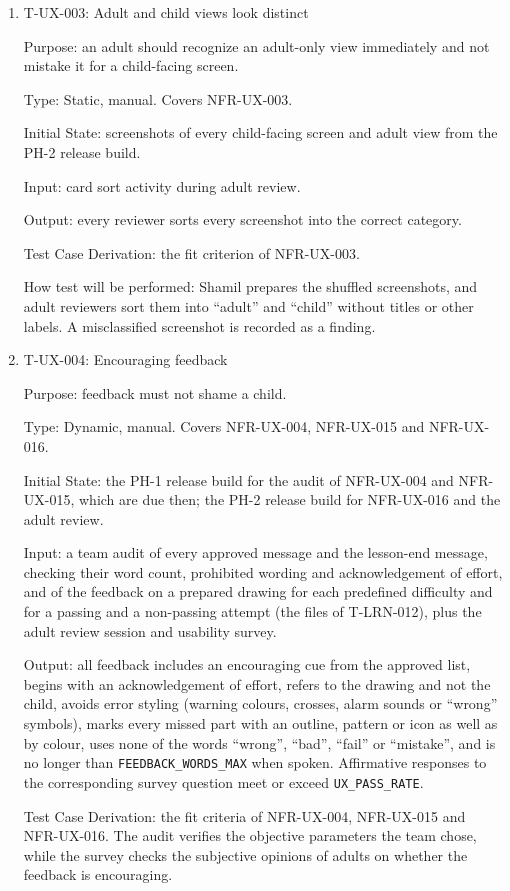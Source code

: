 \documentclass[12pt, titlepage]{article}
\newcommand{\testitem}[1]{\item #1\par\nopagebreak}
\begin{document}
\begin{enumerate}
\testitem{T-UX-003: Adult and child views look distinct}

Purpose: an adult should recognize an adult-only view immediately and not
mistake it for a child-facing screen.

Type: Static, manual. Covers NFR-UX-003.

Initial State: screenshots of every child-facing screen and adult view from
the PH-2 release build.

Input: card sort activity during adult review.

Output: every reviewer sorts every screenshot into the correct category.

Test Case Derivation: the fit criterion of NFR-UX-003.

How test will be performed: Shamil prepares the shuffled screenshots,
and adult reviewers sort them into ``adult'' and ``child'' without titles
or other labels. A misclassified screenshot is recorded as a finding.

\testitem{T-UX-004: Encouraging feedback}

Purpose: feedback must not shame a child.

Type: Dynamic, manual. Covers NFR-UX-004, NFR-UX-015 and NFR-UX-016.

Initial State: the PH-1 release build for the audit of NFR-UX-004 and
NFR-UX-015, which are due then; the PH-2 release build for NFR-UX-016 and the
adult review.

Input: a team audit of every approved message and the lesson-end message,
checking their word count, prohibited wording and acknowledgement of effort,
and of the feedback on a prepared drawing for each predefined difficulty and
for a passing and a non-passing attempt (the files of T-LRN-012), plus the adult
review session and usability survey.

Output: all feedback includes an encouraging cue from the approved list, begins
with an acknowledgement of effort, refers to the drawing and not the child,
avoids error styling (warning colours, crosses, alarm sounds or ``wrong''
symbols), marks every missed part with an outline, pattern or icon as well as by
colour, uses none of the words ``wrong'', ``bad'', ``fail''
or ``mistake'', and is no longer than \texttt{FEEDBACK\_WORDS\_MAX} when spoken. Affirmative responses to the 
corresponding survey question meet or exceed \texttt{UX\_PASS\_RATE}.

Test Case Derivation: the fit criteria of NFR-UX-004, NFR-UX-015 and
NFR-UX-016. The audit verifies the objective parameters the team chose, while the survey
checks the subjective opinions of adults on whether the feedback is encouraging.


\end{enumerate}
\end{document}
